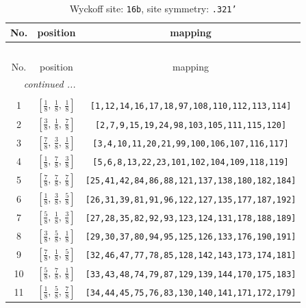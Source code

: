 \documentclass[fleqn,8pt]{jsarticle}
\begin{document}
\begin{longtable}{ccc}
\caption{Wyckoff site: {\tt 16b}, site symmetry: {\tt .321'}}
 \\
 \hline \hline
No. & position & mapping \\ \hline \endfirsthead

\multicolumn{2}{l}{\tablename\ \thetable{}} \\
 \hline \hline
No. & position & mapping \\ \hline \endhead

 \hline \hline
\multicolumn{2}{r}{\footnotesize\it continued ...} \\ \endfoot

 \hline \hline
\multicolumn{2}{r}{} \\ \endlastfoot

1 & $\left[ \frac{1}{8},\, \frac{1}{8},\, \frac{1}{8} \right]$ & {\tt [1,12,14,16,17,18,97,108,110,112,113,114]} \\ \hline
2 & $\left[ \frac{3}{8},\, \frac{1}{8},\, \frac{7}{8} \right]$ & {\tt [2,7,9,15,19,24,98,103,105,111,115,120]} \\ \hline
3 & $\left[ \frac{7}{8},\, \frac{3}{8},\, \frac{1}{8} \right]$ & {\tt [3,4,10,11,20,21,99,100,106,107,116,117]} \\ \hline
4 & $\left[ \frac{1}{8},\, \frac{7}{8},\, \frac{3}{8} \right]$ & {\tt [5,6,8,13,22,23,101,102,104,109,118,119]} \\ \hline
5 & $\left[ \frac{7}{8},\, \frac{7}{8},\, \frac{7}{8} \right]$ & {\tt [25,41,42,84,86,88,121,137,138,180,182,184]} \\ \hline
6 & $\left[ \frac{1}{8},\, \frac{3}{8},\, \frac{5}{8} \right]$ & {\tt [26,31,39,81,91,96,122,127,135,177,187,192]} \\ \hline
7 & $\left[ \frac{5}{8},\, \frac{1}{8},\, \frac{3}{8} \right]$ & {\tt [27,28,35,82,92,93,123,124,131,178,188,189]} \\ \hline
8 & $\left[ \frac{3}{8},\, \frac{5}{8},\, \frac{1}{8} \right]$ & {\tt [29,30,37,80,94,95,125,126,133,176,190,191]} \\ \hline
9 & $\left[ \frac{7}{8},\, \frac{1}{8},\, \frac{5}{8} \right]$ & {\tt [32,46,47,77,78,85,128,142,143,173,174,181]} \\ \hline
10 & $\left[ \frac{5}{8},\, \frac{7}{8},\, \frac{1}{8} \right]$ & {\tt [33,43,48,74,79,87,129,139,144,170,175,183]} \\ \hline
11 & $\left[ \frac{1}{8},\, \frac{5}{8},\, \frac{7}{8} \right]$ & {\tt [34,44,45,75,76,83,130,140,141,171,172,179]} \\ \hline

\end{longtable}
\end{document}
